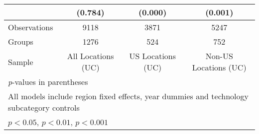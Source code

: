 {\begin{longtable}{l*{3}{c}}
                &  (0.784)         &  (0.000)         &  (0.001)         \\
\hline
Observations    &     9118         &     3871         &     5247         \\
Groups          &     1276         &      524         &      752         \\
Sample          &All Locations (UC)         &US Locations (UC)         &Non-US Locations (UC)         \\
\hline\hline
\multicolumn{4}{l}{\footnotesize \textit{p}-values in parentheses}\\
\multicolumn{4}{l}{\footnotesize All models include region fixed effects, year dummies and technology subcategory controls}\\
\multicolumn{4}{l}{\footnotesize \sym{*} \(p<0.05\), \sym{**} \(p<0.01\), \sym{***} \(p<0.001\)}\\
\end{longtable}
}
